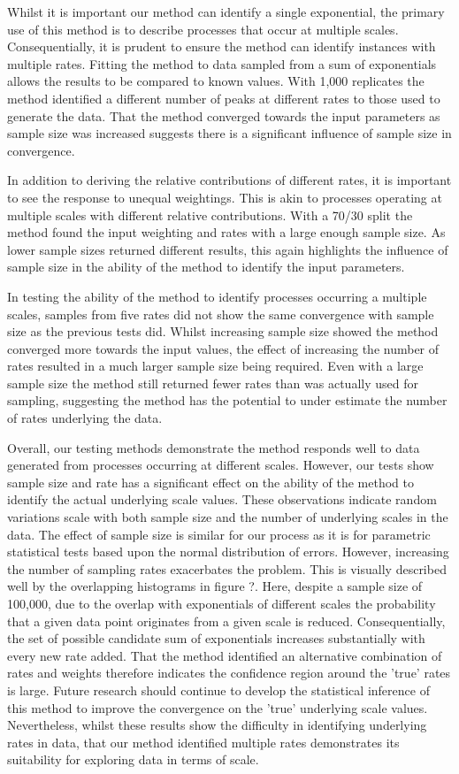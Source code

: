 \documentclass[11pt,usenames,dvipsnames]{article}
\begin{document}
Whilst it is important our method can identify a single exponential, the primary use of this method is to describe processes that occur at multiple scales. Consequentially, it is prudent to ensure the method can identify instances with multiple rates. Fitting the method to data sampled from a sum of exponentials allows the results to be compared to known values. With 1,000 replicates the method identified a different number of peaks at different rates to those used to generate the data. That the method converged towards the input parameters as sample size was increased suggests there is a significant influence of sample size in convergence.

In addition to deriving the relative contributions of different rates, it is important to see the response to unequal weightings. This is akin to processes operating at multiple scales with different relative contributions. With a 70/30 split the method found the input weighting and rates with a large enough sample size. As lower sample sizes returned different results, this again highlights the influence of sample size in the ability of the method to identify the input parameters.

In testing the ability of the method to identify processes occurring a multiple scales, samples from five rates did not show the same convergence with sample size as the previous tests did. Whilst increasing sample size showed the method converged more towards the input values, the effect of increasing the number of rates resulted in a much larger sample size being required. Even with a large sample size the method still returned fewer rates than was actually used for sampling, suggesting the method has the potential to under estimate the number of rates underlying the data. 

Overall, our testing methods demonstrate the method responds well to data generated from processes occurring at different scales. However, our tests show sample size and rate has a significant effect on the ability of the method to identify the actual underlying scale values. These observations indicate random variations scale with both sample size and the number of underlying scales in the data. The effect of sample size is similar for our process as it is for parametric statistical tests based upon the normal distribution of errors. However, increasing the number of sampling rates exacerbates the problem. This is visually described well by the overlapping histograms in figure ?. Here, despite a sample size of 100,000, due to the overlap with exponentials of different scales the probability that a given data point originates from a given scale is reduced. Consequentially, the set of possible candidate sum of exponentials increases substantially with every new rate added. That the method identified an alternative combination of rates and weights therefore indicates the confidence region around the 'true' rates is large. Future research should continue to develop the statistical inference of this method to improve the convergence on the 'true' underlying scale values. Nevertheless, whilst these results show the difficulty in identifying underlying rates in data, that our method identified multiple rates demonstrates its suitability for exploring data in terms of scale.
\end{document}
